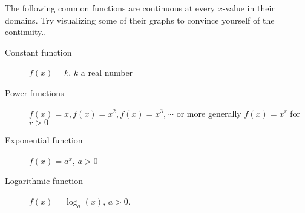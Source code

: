 \documentclass{ximera}
\begin{document}
 
\begin{remark}
The following common functions are continuous at every $x$-value in their domains.  Try visualizing some of their graphs to convince yourself of the continuity.. 
\begin{description}
\item[Constant function] $f(x) =k$, $k$ a real number
\item[Power functions] $f(x)=x, f(x)=x^2, f(x)=x^3, \cdots$ or more generally $f(x)=x^r$ for $r>0$
\item[Exponential function] $f(x)=a^x$, $a>0$
\item[Logarithmic function] $f(x)=\log_a(x)$, $a>0$.
\end{description}

 
\end{remark}
 
 
 

 
\end{document}
